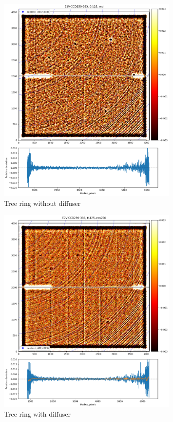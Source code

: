 \begin{figure}[ht]
\centering
\includegraphics[width=0.8\textwidth]{figures/TR_wo_diffuser.png}
\caption{Tree ring without diffuser}
\end{figure}


\begin{figure}[ht]
\centering
\includegraphics[width=0.8\textwidth]{figures/TR_w_diffuser.png}
\caption{Tree ring with diffuser}
\end{figure}

